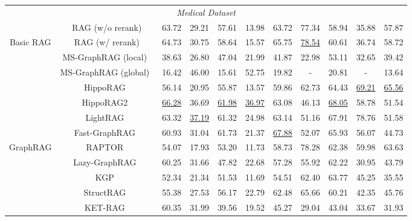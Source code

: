 \documentclass{article} %
\begin{document}
\begin{table}[!t]
{\begin{tabular}{c|c|cc|cc|cc|ccc}
\midrule
\multicolumn{11}{c}{\cellcolor[HTML]{EFEFEF}\textit{Medical Dataset}} \\
 & RAG (w/o rerank) & 63.72 & 29.21 & 57.61 & 13.98 & 63.72 & 77.34 & 58.94 & 35.88 & 57.87 \\
\multirow{-2}{*}{Basic RAG} & RAG (w/ rerank) & 64.73 & 30.75 & 58.64 & 15.57 & 65.75 & \underline{78.54} & 60.61 & 36.74 & 58.72 \\
\midrule
& MS-GraphRAG (local)~\citep{edge2024local} & 38.63 & 26.80 & 47.04 & 21.99 & 41.87 & 22.98 & 53.11 & 32.65 & 39.42 \\
 & MS-GraphRAG (global)~\citep{edge2024local} & 16.42 & 46.00 & 15.61 & 52.75 & 19.82 & - & 20.81 & - & 13.64 \\
 & HippoRAG~\citep{HippoRAG} & 56.14 & 20.95 & 55.87 & 13.57 & 59.86 & 62.73 & 64.43 & \underline{69.21} & \underline{65.56} \\
 & HippoRAG2~\citep{gutiérrez2025HippoRAG2} & \underline{66.28} & 36.69 & \underline{61.98} & \underline{36.97} & 63.08 & 46.13 & \underline{68.05} & 58.78 & 51.54 \\
 & LightRAG~\citep{guo2024lightrag} & 63.32 & \underline{37.19} & 61.32 & 24.98 & 63.14 & 51.16 & 67.91 & 78.76 & 51.58 \\
 & Fast-GraphRAG~\citep{fastgraphrag2024} & 60.93 & 31.04 & 61.73 & 21.37 & \underline{67.88} & 52.07 & 65.93 & 56.07 & 44.73 \\
\multirow{-10}{*}{GraphRAG} & RAPTOR~\citep{sarthi2024raptor} & 54.07 & 17.93 & 53.20 & 11.73 & 58.73 & 78.28 & 62.38 & 59.98 & 63.63 \\
& Lazy-GraphRAG~\citep{LazyGraphRAG} & 60.25 & 31.66 & 47.82 & 22.68 & 57.28 & 55.92 & 62.22 & 30.95 & 43.79 \\
& KGP~\citep{wang2024knowledge} &52.34 & 21.34 &51.53  &11.69  &54.51  &62.40  & 63.77 & 45.25 & 35.55 \\
& StructRAG~\citep{li2024structrag} &55.38 & 27.53 &56.17  &22.79  &62.48  &65.66  & 60.21 & 42.35 & 45.76 \\
& KET-RAG~\citep{huang2025ket} &60.35 & 31.99 &39.56  &19.52  &45.27  &29.04  & 43.04 & 33.67 & 31.93 \\
\bottomrule
\end{tabular}
}
\label{tab:appedix-generate1}
\end{table}
\end{document}
